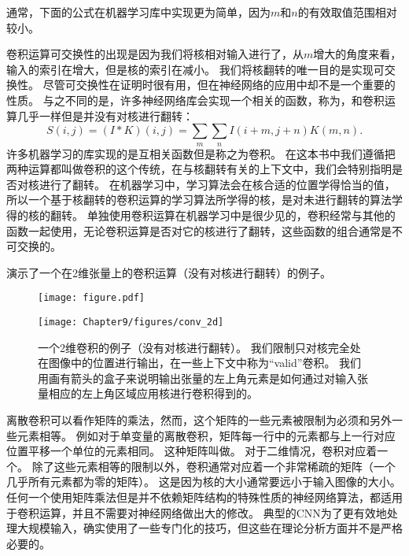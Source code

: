 通常，下面的公式在机器学习库中实现更为简单，因为$m$和$n$的有效取值范围相对较小。

 
卷积运算可交换性的出现是因为我们将核相对输入进行了，从$m$增大的角度来看，输入的索引在增大，但是核的索引在减小。
我们将核翻转的唯一目的是实现可交换性。
尽管可交换性在证明时很有用，但在神经网络的应用中却不是一个重要的性质。
与之不同的是，许多神经网络库会实现一个相关的函数，称为，和卷积运算几乎一样但是并没有对核进行翻转：
\begin{equation}
S(i, j) = (I*K)(i, j) = \sum_m \sum_n I(i+m, j+n) K(m, n).
\end{equation}
许多机器学习的库实现的是互相关函数但是称之为卷积。
在这本书中我们遵循把两种运算都叫做卷积的这个传统，在与核翻转有关的上下文中，我们会特别指明是否对核进行了翻转。
在机器学习中，学习算法会在核合适的位置学得恰当的值， 所以一个基于核翻转的卷积运算的学习算法所学得的核，是对未进行翻转的算法学得的核的翻转。
单独使用卷积运算在机器学习中是很少见的，卷积经常与其他的函数一起使用，无论卷积运算是否对它的核进行了翻转，这些函数的组合通常是不可交换的。

演示了一个在2维张量上的卷积运算（没有对核进行翻转）的例子。
\begin{figure}[!htb]
\ifOpenSource
\centerline{\texttt{[image: figure.pdf]}}
\else
\centerline{\texttt{[image: Chapter9/figures/conv\_2d]}}
\fi
\caption{一个2维卷积的例子（没有对核进行翻转）。
我们限制只对核完全处在图像中的位置进行输出，在一些上下文中称为``\gls{valid}''卷积。
我们用画有箭头的盒子来说明输出张量的左上角元素是如何通过对输入张量相应的左上角区域应用核进行卷积得到的。}
\label{fig:chap9_conv_2d}
\end{figure}

离散卷积可以看作矩阵的乘法，然而，这个矩阵的一些元素被限制为必须和另外一些元素相等。
例如对于单变量的离散卷积，矩阵每一行中的元素都与上一行对应位置平移一个单位的元素相同。
这种矩阵叫做。
对于二维情况，卷积对应着一个。
除了这些元素相等的限制以外，卷积通常对应着一个非常稀疏的矩阵（一个几乎所有元素都为零的矩阵）。
这是因为核的大小通常要远小于输入图像的大小。任何一个使用矩阵乘法但是并不依赖矩阵结构的特殊性质的神经网络算法，都适用于卷积运算，并且不需要对神经网络做出大的修改。
典型的\gls{CNN}为了更有效地处理大规模输入，确实使用了一些专门化的技巧，但这些在理论分析方面并不是严格必要的。

 
